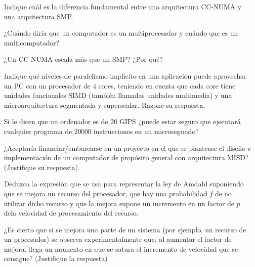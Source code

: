 \begin{cuestion}
    Indique cuál es la diferencia fundamental entre una arquitectura CC-NUMA y una arquitectura
    SMP.
\end{cuestion}

\begin{cuestion}
    ¿Cuándo diría que un computador es un multiprocesador y cuándo que es un multicomputador?
\end{cuestion}

\begin{cuestion}
    ¿Un CC-NUMA escala más que un SMP? ¿Por qué?
\end{cuestion}

\begin{cuestion}
    Indique qué niveles de paralelismo implícito en una aplicación puede aprovechar un PC con un
    procesador de 4 cores, teniendo en cuenta que cada core tiene unidades funcionales SIMD (también
    llamadas unidades multimedia) y una microarquitectura segmentada y superscalar. Razone su respuesta.
\end{cuestion}

\begin{cuestion}
    Si le dicen que un ordenador es de 20 GIPS ¿puede estar seguro que ejecutará cualquier
    programa de $20000$ instrucciones en un microsegundo?
\end{cuestion}

\begin{cuestion}
    ¿Aceptaría financiar/embarcarse en un proyecto en el que se plantease el diseño e implementación de un
    computador de propósito general con arquitectura MISD? (Justifique su respuesta).
\end{cuestion}

\begin{cuestion}
    Deduzca la expresión que se usa para representar la ley de Amdahl suponiendo que se mejora un
    recurso del procesador, que hay una probabilidad $f$ de no utilizar dicho recurso y que la mejora supone
    un incremento en un factor de $p$ dela velocidad de procesamiento del recurso.
\end{cuestion}

\begin{cuestion}
    ¿Es cierto que si se mejora una parte de un sistema (por ejemplo, un recurso de un procesador) se
    observa experimentalmente que, al aumentar el factor de mejora, llega un momento en que se satura el
    incremento de velocidad que se consigue? (Justifique la respuesta)
\end{cuestion}

